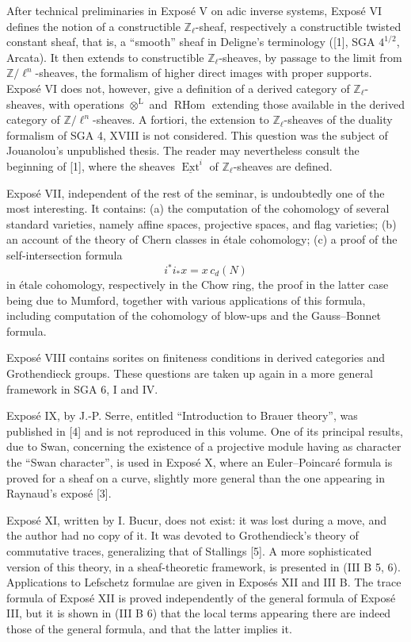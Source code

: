 \documentclass[11pt]{article}
\theoremstyle{plain}
\theoremstyle{definition}
\theoremstyle{remark}
\newcommand{\Z}{\mathbb Z}\newcommand{\Q}{\mathbb Q}\newcommand{\N}{\mathbb N}\newcommand{\A}{\mathbb A}\newcommand{\Pp}{\mathbb P}
\DeclareMathOperator{\RHom}{RHom}
\begin{document}
After technical preliminaries in Exposé V on adic inverse systems, Exposé VI defines the notion of a constructible $\Z_\ell$-sheaf, respectively a constructible twisted constant sheaf, that is, a ``smooth'' sheaf in Deligne's terminology ([1], SGA $4^{1/2}$, Arcata). It then extends to constructible $\Z_\ell$-sheaves, by passage to the limit from $\Z/\ell^n$-sheaves, the formalism of higher direct images with proper supports. Exposé VI does not, however, give a definition of a derived category of $\Z_\ell$-sheaves, with operations $\otimes^{\mathrm L}$ and $\RHom$ extending those available in the derived category of $\Z/\ell^n$-sheaves. A fortiori, the extension to $\Z_\ell$-sheaves of the duality formalism of SGA 4, XVIII is not considered. This question was the subject of Jouanolou's unpublished thesis. The reader may nevertheless consult the beginning of [1], where the sheaves $\underline{\operatorname{Ext}}^i$ of $\Z_\ell$-sheaves are defined.

Exposé VII, independent of the rest of the seminar, is undoubtedly one of the most interesting. It contains: (a) the computation of the cohomology of several standard varieties, namely affine spaces, projective spaces, and flag varieties; (b) an account of the theory of Chern classes in étale cohomology; (c) a proof of the self-intersection formula
\[
i^*i_*x=x\,c_d(N)
\]
in étale cohomology, respectively in the Chow ring, the proof in the latter case being due to Mumford, together with various applications of this formula, including computation of the cohomology of blow-ups and the Gauss--Bonnet formula.

Exposé VIII contains sorites on finiteness conditions in derived categories and Grothendieck groups. These questions are taken up again in a more general framework in SGA 6, I and IV.

Exposé IX, by J.-P. Serre, entitled ``Introduction to Brauer theory'', was published in [4] and is not reproduced in this volume. One of its principal results, due to Swan, concerning the existence of a projective module having as character the ``Swan character'', is used in Exposé X, where an Euler--Poincaré formula is proved for a sheaf on a curve, slightly more general than the one appearing in Raynaud's exposé [3].

Exposé XI, written by I. Bucur, does not exist: it was lost during a move, and the author had no copy of it. It was devoted to Grothendieck's theory of commutative traces, generalizing that of Stallings [5]. A more sophisticated version of this theory, in a sheaf-theoretic framework, is presented in (III B 5, 6). Applications to Lefschetz formulae are given in Exposés XII and III B. The trace formula of Exposé XII is proved independently of the general formula of Exposé III, but it is shown in (III B 6) that the local terms appearing there are indeed those of the general formula, and that the latter implies it.
\end{document}
